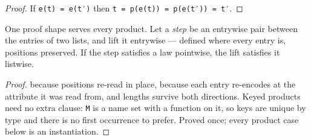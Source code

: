 \begin{proof}
\leanok
If \texttt{e(t)\ =\ e(t′)} then \texttt{t\ =\ p(e(t))\ =\ p(e(t′))\ =\ t′}.
\end{proof}

\begin{lemma}[traversal]
\label{lem:traversal}
\leanok
One proof shape serves every product. Let a \emph{step} be an entrywise pair
between the entries of two lists, and lift it entrywise — defined where every entry is, positions
preserved. If the step satisfies a law pointwise, the lift satisfies it listwise.
\end{lemma}

\begin{proof}
\leanok
{} because
positions re-read in place,  because each entry re-encodes at the attribute it
was read from, and lengths survive both directions. Keyed products need no extra clause: \texttt{M} is
a name set with a function on it, so keys are unique by type and there is no first occurrence to
prefer. Proved once; every product case
below is an instantiation.
\end{proof}

